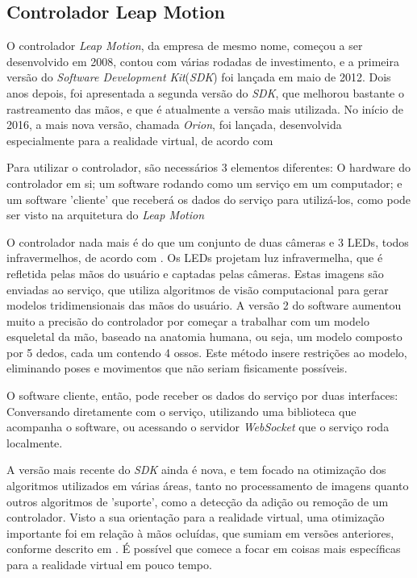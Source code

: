\subsection{Controlador Leap Motion}\label{subsec-teo-leap-motion}

O controlador \textit{Leap Motion}, da empresa de mesmo nome, começou a ser desenvolvido 
em 2008, contou com várias rodadas de investimento, e a primeira versão do 
\textit{Software Development Kit}(\textit{SDK}) foi lançada em maio de 2012. Dois anos depois, foi 
apresentada a segunda versão do \textit{SDK}, que melhorou bastante o rastreamento das 
mãos, e que é atualmente a versão mais utilizada. No início de 2016, a mais 
nova versão, chamada \textit{Orion}, foi lançada, desenvolvida especialmente para a 
realidade virtual, de acordo com \cite{leap:2016:changeset}

Para utilizar o controlador, são necessários 3 elementos diferentes: O hardware 
do controlador em si; um software rodando como um serviço em um computador; 
e um software 'cliente' que receberá os dados do serviço para utilizá-los, 
como pode ser visto na arquitetura do \textit{Leap Motion} \cite{leap:2016:architecture}

O controlador nada mais é do que um conjunto de duas câmeras e 3 LEDs, todos 
infravermelhos, de acordo com \cite{leap:2016:how-it-works}. Os LEDs projetam
luz infravermelha, que é refletida pelas mãos do usuário e captadas 
pelas câmeras. Estas imagens são enviadas ao serviço, 
que utiliza algoritmos de visão computacional para gerar modelos tridimensionais 
das mãos do usuário. A versão 2 do software aumentou muito a precisão do 
controlador por começar a trabalhar com um modelo esqueletal da mão, baseado 
na anatomia humana, ou seja, um modelo composto por 5 dedos, cada um contendo 
4 ossos. Este método insere restrições ao modelo, eliminando poses e movimentos 
que não seriam fisicamente possíveis.

O software cliente, então, pode receber os dados do serviço por duas interfaces:
Conversando diretamente com o serviço, utilizando uma biblioteca que acompanha o software, 
ou acessando o servidor \textit{WebSocket} que o serviço roda localmente.

A versão mais recente do \textit{SDK} ainda é nova, e tem focado na otimização dos 
algoritmos utilizados em várias áreas, tanto no processamento de imagens quanto 
outros algoritmos de 'suporte', como a detecção da adição ou remoção de um 
controlador. Visto a sua orientação para a realidade virtual, uma otimização 
importante foi em relação à mãos ocluídas, que sumiam em versões anteriores, 
conforme descrito em \cite{leap:2016:changeset}. É possível que comece a focar 
em coisas mais específicas para a realidade virtual em pouco tempo.

